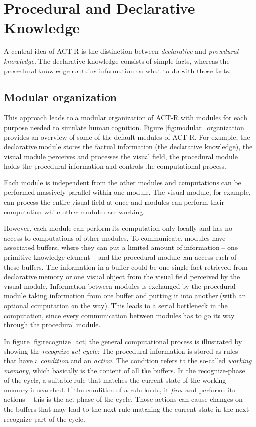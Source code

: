 \section{Procedural and Declarative Knowledge}

A central idea of ACT-R is the distinction between \emph{declarative} and \emph{procedural knowledge.} The declarative knowledge consists of simple facts, whereas the procedural knowledge contains information on what to do with those facts.

\subsection{Modular organization}

This approach leads to a modular organization of ACT-R with modules for each purpose needed to simulate human cognition. Figure \ref{fig:modular_organization} provides an overview of some of the default modules of ACT-R. For example, the declarative module stores the factual information (the declarative knowledge), the visual module perceives and processes the visual field, the procedural module holds the procedural information and controls the computational process. 

Each module is independent from the other modules and computations can be performed massively parallel within one module. The visual module, for example, can process the entire visual field at once and modules can perform their computation while other modules are working.

However, each module can perform its computation only locally and has no access to computations of other modules. To communicate, modules have associated buffers, where they can put a limited amount of information -- one primitive knowledge element -- and the procedural module can access each of these buffers. The information in a buffer could be one single fact retrieved from declarative memory or one visual object from the visual field perceived by the visual module. Information between modules is exchanged by the procedural module taking information from one buffer and putting it into another (with an optional computation on the way). This leads to a serial bottleneck in the computation, since every communication between modules has to go its way through the procedural module.

In figure \ref{fig:recognize_act} the general computational process is illustrated by showing the \emph{recognize-act-cycle}: The procedural information is stored as rules that have a \emph{condition} and an \emph{action}. The condition refers to the so-called \emph{working memory}, which basically is the content of all the buffers. In the recognize-phase of the cycle, a suitable rule that matches the current state of the working memory is searched. If the condition of a rule holds, it \emph{fires} and performs its actions -- this is the act-phase of the cycle. Those actions can cause changes on the buffers that may lead to the next rule matching the current state in the next recognize-part of the cycle.

